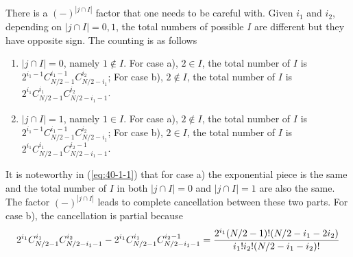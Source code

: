 \documentclass[11pt]{article}
\renewcommand{\>}{\rangle}
\newcommand{\<}{\langle}
\begin{document}
There is a $(-)^{|j\cap I|}$ factor that one needs to be careful
with. Given $i_{1}$ and $i_{2}$, depending on $|j\cap I|=0,1$,
the total numbers of possible $I$ are different but they have opposite
sign. The counting is as follows
\begin{enumerate}
\item $|j\cap I|=0$, namely $1\notin I$. For case a), $2\in I$, the total
number of $I$ is $2^{i_{1}-1}C_{N/2-1}^{i_{1}-1}C_{N/2-i_{1}}^{i_{2}}$;
For case b), $2\notin I$, the total number of $I$ is $2^{i_{1}}C_{N/2-1}^{i_{1}}C_{N/2-i_{1}-1}^{i_{2}}$.
\item $|j\cap I|=1$, namely $1\in I$. For case a), $2\notin I$, the total
number of $I$ is $2^{i_{1}-1}C_{N/2-1}^{i_{1}-1}C_{N/2-i_{1}}^{i_{2}}$;
For case b), $2\in I$, the total number of $I$ is $2^{i_{1}}C_{N/2-1}^{i_{1}}C_{N/2-i_{1}-1}^{i_{2}-1}$.
\end{enumerate}
It is noteworthy in (\ref{eq:40-1-1}) that for case a) the exponential
piece is the same and the total number of $I$ in both $|j\cap I|=0$
and $|j\cap I|=1$ are also the same. The factor $(-)^{|j\cap I|}$
leads to complete cancellation between these two parts. For case b),
the cancellation is partial because 
\begin{equation}
2^{i_{1}}C_{N/2-1}^{i_{1}}C_{N/2-i_{1}-1}^{i_{2}}-2^{i_{1}}C_{N/2-1}^{i_{1}}C_{N/2-i_{1}-1}^{i_{2}-1}=\frac{2^{i_{1}}(N/2-1)!(N/2-i_{1}-2i_{2})}{i_{1}!i_{2}!(N/2-i_{1}-i_{2})!}
\end{equation}
\end{document}
